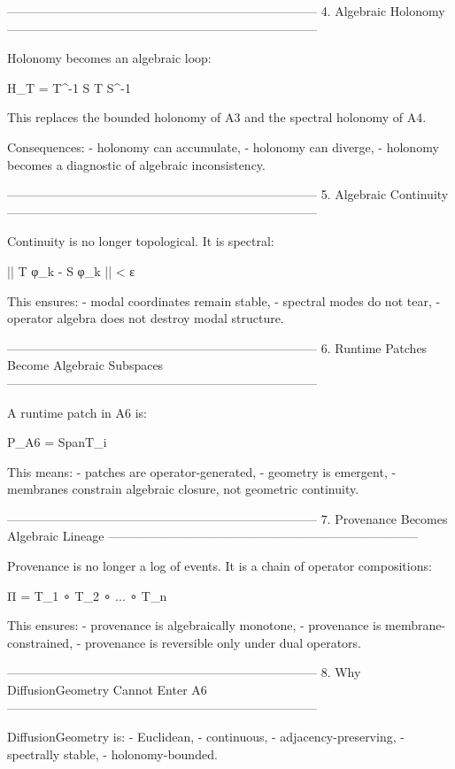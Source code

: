 ---------------------------------------------------------------------------
4. Algebraic Holonomy
---------------------------------------------------------------------------

Holonomy becomes an algebraic loop:

    H_T = T^{-1} S T S^{-1}

This replaces the bounded holonomy of A3 and the spectral holonomy of A4.

Consequences:
- holonomy can accumulate,
- holonomy can diverge,
- holonomy becomes a diagnostic of algebraic inconsistency.

---------------------------------------------------------------------------
5. Algebraic Continuity
---------------------------------------------------------------------------

Continuity is no longer topological. It is spectral:

    || T φ_k - S φ_k || < ε

This ensures:
- modal coordinates remain stable,
- spectral modes do not tear,
- operator algebra does not destroy modal structure.

---------------------------------------------------------------------------
6. Runtime Patches Become Algebraic Subspaces
---------------------------------------------------------------------------

A runtime patch in A6 is:

    P_A6 = Span{T_i}

This means:
- patches are operator-generated,
- geometry is emergent,
- membranes constrain algebraic closure, not geometric continuity.

---------------------------------------------------------------------------
7. Provenance Becomes Algebraic Lineage
---------------------------------------------------------------------------

Provenance is no longer a log of events. It is a chain of operator compositions:

    Π = T_1 ∘ T_2 ∘ ... ∘ T_n

This ensures:
- provenance is algebraically monotone,
- provenance is membrane-constrained,
- provenance is reversible only under dual operators.

---------------------------------------------------------------------------
8. Why DiffusionGeometry Cannot Enter A6
---------------------------------------------------------------------------

DiffusionGeometry is:
- Euclidean,
- continuous,
- adjacency-preserving,
- spectrally stable,
- holonomy-bounded.

